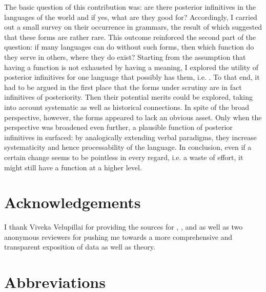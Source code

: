 \documentclass[output=paper,hidelinks]{langscibook}
\begin{document}
The basic question of this contribution was: are there posterior infinitives in the languages of the world and if yes, what are they good for? Accordingly, I carried out a small survey on their occurrence in grammars, the result of which suggested that these forms are rather rare. This outcome reinforced the second part of the question: if many languages can do without such forms, then which function do they serve in others, where they do exist? Starting from the assumption that having a function is not exhausted by having a meaning, I explored the utility of posterior infinitives for one language that possibly has them, i.e. . To that end, it had to be argued in the first place that the forms under scrutiny are in fact infinitives of posteriority. Then their potential merits could be explored, taking into account systematic as well as historical connections. In spite of the broad perspective, however, the forms appeared to lack an obvious asset. Only when the perspective was broadened even further, a plausible function of posterior infinitives in  surfaced: by analogically extending verbal paradigms, they increase systematicity and hence processability of the language. In conclusion, even if a certain change seems to be pointless in every regard, i.e. a waste of effort, it might still have a function at a higher level.

\section*{Acknowledgements}

I thank Viveka Velupillai for providing the sources for , , and  as well as two anonymous reviewers for pushing me towards a more comprehensive and transparent exposition of data as well as theory.

\section*{Abbreviations}
\end{document}
